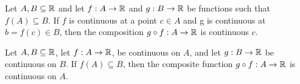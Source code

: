 \begin{theorem}
	Let $A,B \subseteq \mathbb{R}$ and let $f:A \rightarrow \mathbb{R}$ and $g:B \rightarrow \mathbb{R}$ be functions such that $f(A) \subseteq B$. If $f$ is continuous at a point $c \in A$ and g is continuous at $b= f(c) \in B$, then the composition $g \circ f:A \rightarrow \mathbb{R}$ is continuous $c$.
\end{theorem}

\begin{theorem}
	Let $A,B \subseteq \mathbb{R}$, let $f:A \rightarrow \mathbb{R}$, be continuous on $A$, and let $g:B \rightarrow \mathbb{R}$ be continuous on $B$. If $f(A) \subseteq B$, then the composite function $g \circ f:A \rightarrow \mathbb{R}$ is continuous on $A$.
\end{theorem}
